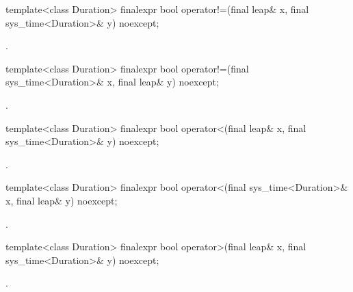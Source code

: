 %
%
\begin{itemdecl}
template<class Duration>
  finalexpr bool operator!=(final leap& x, final sys_time<Duration>& y) noexcept;
\end{itemdecl}

\begin{itemdescr}
\pnum
\returns {}.
\end{itemdescr}

%
%
\begin{itemdecl}
template<class Duration>
  finalexpr bool operator!=(final sys_time<Duration>& x, final leap& y) noexcept;
\end{itemdecl}

\begin{itemdescr}
\pnum
\returns {}.
\end{itemdescr}

%
%
\begin{itemdecl}
template<class Duration>
  finalexpr bool operator<(final leap& x, final sys_time<Duration>& y) noexcept;
\end{itemdecl}

\begin{itemdescr}
\pnum
\returns {}.
\end{itemdescr}

%
%
\begin{itemdecl}
template<class Duration>
  finalexpr bool operator<(final sys_time<Duration>& x, final leap& y) noexcept;
\end{itemdecl}

\begin{itemdescr}
\pnum
\returns {}.
\end{itemdescr}

%
%
\begin{itemdecl}
template<class Duration>
  finalexpr bool operator>(final leap& x, final sys_time<Duration>& y) noexcept;
\end{itemdecl}

\begin{itemdescr}
\pnum
\returns {}.
\end{itemdescr}

